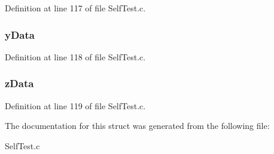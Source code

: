 Definition at line 117 of file Self\-Test.\-c.

\hypertarget{struct_three_axis_sensor_data__t_a09ae4bb2b92fbe9e5422b1b6f602ff10}{
\subsubsection[{y\-Data}]{ y\-Data}}\label{struct_three_axis_sensor_data__t_a09ae4bb2b92fbe9e5422b1b6f602ff10}


Definition at line 118 of file Self\-Test.\-c.

\hypertarget{struct_three_axis_sensor_data__t_ae92f459ab8384b36ba61695c68feb33e}{
\subsubsection[{z\-Data}]{ z\-Data}}\label{struct_three_axis_sensor_data__t_ae92f459ab8384b36ba61695c68feb33e}


Definition at line 119 of file Self\-Test.\-c.



The documentation for this struct was generated from the following file\-:\begin{DoxyCompactItemize}
\item 
Self\-Test.\-c\end{DoxyCompactItemize}
